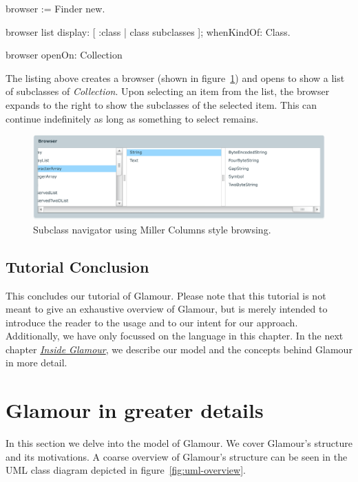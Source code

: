 \documentclass[a4paper,10pt,twoside]{book}
\begin{document}
\begin{code}{}
browser := Finder new.

browser list
	display: [ :class | class subclasses ];
	whenKindOf: Class.

browser openOn: Collection
\end{code}

The listing above creates a browser (shown in figure~\ref{fig:finder}) and opens to show a list of subclasses of \emph{Collection}. Upon selecting an item from the list, the browser expands to the right to show the subclasses of the selected item. This can continue indefinitely as long as something to select remains.

\begin{figure}[htbp]
\centerline{\includegraphics[width=\linewidth]{finder.pdf}}
\caption{Subclass navigator using Miller Columns style browsing.}
\label{fig:finder}
\end{figure}

\subsection{Tutorial Conclusion}

This concludes our tutorial of Glamour. Please note that this tutorial is not meant to give an exhaustive overview of Glamour, but is merely intended to introduce the reader to the usage and to our intent for our approach. Additionally, we have only focussed on the language in this chapter. In the next chapter \hyperref[chp:design]{\emph{Inside Glamour}}, we describe our model and the concepts behind Glamour in more detail.



\section{Glamour in greater details}

In this section we delve into the model of Glamour. We cover Glamour's
structure and its motivations. A coarse overview of Glamour's
structure can be seen in the UML class diagram depicted in
figure~\ref{fig:uml-overview}.
\end{document}
